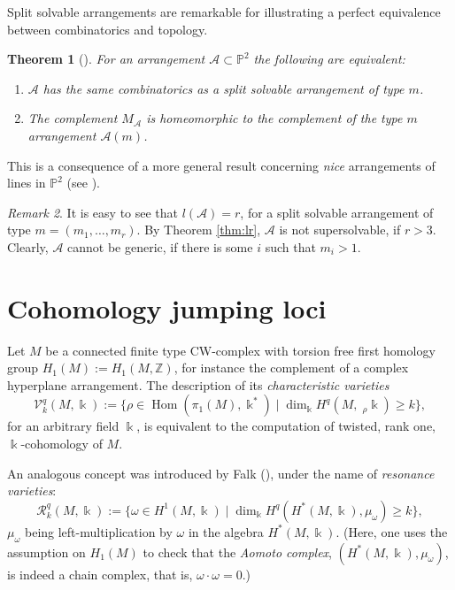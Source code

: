 \documentclass[psamsfonts]{conm-p-l}
\newtheorem{theorem}{Theorem}[section]
\theoremstyle{definition}
\theoremstyle{remark}
\newtheorem{remark}[theorem]{Remark}
\numberwithin{equation}{section}
\newcommand{\A}{{\mathcal A}}
\newcommand{\RR}{{\mathcal R}}
\newcommand{\VV}{{\mathcal V}}
\newcommand{\Z}{\mathbb{Z}}
\newcommand{\p}{\mathbb{P}}
\DeclareMathOperator{\Hom}{Hom}
\begin{document}
Split solvable arrangements are remarkable for illustrating a perfect 
equivalence between combinatorics and topology.

\begin{theorem}[\cite{CDP}]
\label{cor17}
For an arrangement $\A \subset \p^2$ the following are equivalent:
\begin{enumerate}
\item \label{comb}
$\A$ has the same combinatorics as a split solvable arrangement of type $m$.
\item \label{toptype}
The complement $M_{\A}$ is homeomorphic to the complement of the type $m$ arrangement $\A(m)$.                       
\end{enumerate}
\end{theorem}

This is  a consequence of a more general result concerning {\it nice} 
arrangements of lines in $\p^2$ (see \cite[Theorem 1.6]{CDP}).

\begin{remark}
\label{rem:more}
It is easy to see that $l(\A)=r$, for a split solvable arrangement of 
type $m=(m_1, \dots, m_r)$. By Theorem \ref{thm:lr}, $\A$ is not supersolvable, if $r>3$.
Clearly, $\A$ cannot be generic, if there is some $i$ such that $m_i>1$.
\end{remark}

\section{Cohomology jumping loci}
\label{sect:VR}

 Let $M$ be a connected finite type CW-complex with torsion free first homology group 
 $H_1(M):=H_1(M, \Z)$, for instance 
 the complement of a complex hyperplane arrangement. The 
 description of its {\it characteristic varieties}
\begin{equation}
\label{eq:charvar}
\VV^q_k(M, \Bbbk):= \{ \rho \in \Hom(\pi_1(M), \Bbbk^*) \;|\;\dim_{\Bbbk} H^q(M,\;_{\rho}\Bbbk) \geq k\},
\end{equation}
for an arbitrary field $\Bbbk$, is equivalent to the computation of twisted, rank one, 
$\Bbbk$-cohomology of $M$.

An analogous concept was introduced by Falk (\cite{Fa3}), under 
the name of {\em resonance varieties}:
%
\begin{equation}
\label{res}
\RR_{k}^{q}(M, \Bbbk) :=\{ \omega \in H^1(M, \Bbbk) \;|\; \dim_{\Bbbk}H^q(H^*(M,\Bbbk), \mu_{\omega})\geq k\},
\end{equation}
$\mu_{\omega}$ being left-multiplication by $\omega$ in the algebra $H^*(M,\Bbbk)$. 
(Here, one uses the assumption on $H_1(M)$ to check that the {\em Aomoto complex},
$(H^*(M,\Bbbk), \mu_{\omega})$, is indeed a chain complex, that is, $\omega \cdot \omega =0$.)
\end{document}
